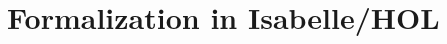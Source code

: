 \documentclass[aspectratio=169,10pt]{beamer}
\begin{document}
\section{Formalization in Isabelle/HOL}

\end{document}
